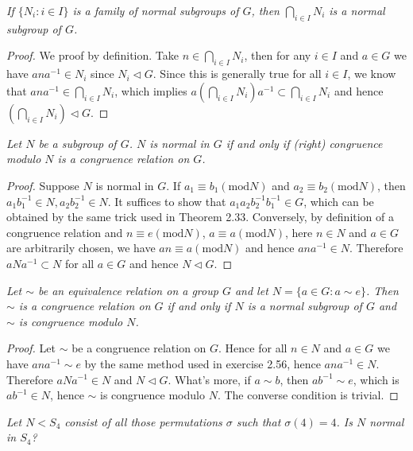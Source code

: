 \begin{problem}\em
If $\{N_i:i\in I\}$ is a family of normal subgroups of $G$, then $\bigcap_{i\in I}N_i$ is a normal subgroup of $G$.
\end{problem}
\begin{proof}
We proof by definition. Take $n\in\bigcap_{i\in I}N_i$, then for any $i\in I$ and $a\in G$ we have $ana^{-1}\in N_i$ since $N_i\lhd G$. Since this is generally true for all $i\in I$, we know that $ana^{-1}\in\bigcap_{i\in I}N_i$, which implies $a\left(\bigcap_{i\in I}N_i\right)a^{-1}\subset\bigcap_{i\in I}N_i$ and hence $\left(\bigcap_{i\in I}N_i\right)\lhd G$.
\end{proof}
\begin{problem}\em
Let $N$ be a subgroup of $G$. $N$ is normal in $G$ if and only if (right) congruence modulo $N$ is a congruence relation on $G$.
\end{problem}
\begin{proof}
Suppose $N$ is normal in $G$. If $a_1\equiv b_1(\mathrm{mod}N)$ and $a_2\equiv b_2(\mathrm{mod}N)$, then $a_1b_1^{-1}\in N,a_2b_2^{-1}\in N$. It suffices to show that $a_1a_2b_2^{-1}b_1^{-1}\in G$, which can be obtained by the same trick used in Theorem 2.33. Conversely, by definition of a congruence relation and $n\equiv e(\mathrm{mod}N)$, $a\equiv a(\mathrm{mod}N)$, here $n\in N$ and $a\in G$ are arbitrarily chosen, we have $an\equiv a(\mathrm{mod}N)$ and hence $ana^{-1}\in N$. Therefore $aNa^{-1}\subset N$ for all $a\in G$ and hence $N\lhd G$.
\end{proof}
\begin{problem}\em
Let $\sim$ be an equivalence relation on a group $G$ and let $N=\{a\in G:a\sim e\}$. Then $\sim$ is a congruence relation on $G$ if and only if $N$ is a normal subgroup of $G$ and $\sim$ is congruence modulo $N$.
\end{problem}
\begin{proof}
Let $\sim$ be a congruence relation on $G$. Hence for all $n\in N$ and $a\in G$ we have $ana^{-1}\sim e$ by the same method used in exercise 2.56, hence $ana^{-1}\in N$. Therefore $aNa^{-1}\in N$ and $N\lhd G$. What's more, if $a\sim b$, then $ab^{-1}\sim e$, which is $ab^{-1}\in N$, hence $\sim$ is congruence modulo $N$. The converse condition is trivial.
\end{proof}
\begin{problem}\em
Let $N<S_4$ consist of all those permutations $\sigma$ such that $\sigma(4)=4$. Is $N$ normal in $S_4$?
\end{problem}
